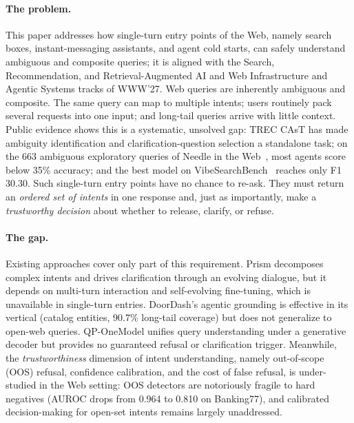 \documentclass[sigconf, anonymous, review]{acmart}
\begin{document}
\paragraph{The problem.}
This paper addresses how single-turn entry points of the Web, namely search boxes, instant-messaging assistants, and agent cold starts, can safely understand ambiguous and composite queries; it is aligned with the Search, Recommendation, and Retrieval-Augmented AI and Web Infrastructure and Agentic Systems tracks of WWW'27. Web queries are inherently ambiguous and composite. The same query can map to multiple intents; users routinely pack several requests into one input; and long-tail queries arrive with little context. Public evidence shows this is a systematic, unsolved gap: TREC CAsT has made ambiguity identification and clarification-question selection a standalone task; on the 663 ambiguous exploratory queries of Needle in the Web~\citep{needleweb}, most agents score below 35\% accuracy; and the best model on VibeSearchBench~\citep{vibesearch} reaches only F1 30.30. Such single-turn entry points have no chance to re-ask. They must return an \textit{ordered set of intents} in one response and, just as importantly, make a \textit{trustworthy decision} about whether to release, clarify, or refuse.

\paragraph{The gap.}
Existing approaches cover only part of this requirement. Prism decomposes complex intents and drives clarification through an evolving dialogue, but it depends on multi-turn interaction and self-evolving fine-tuning, which is unavailable in single-turn entries. DoorDash's agentic grounding is effective in its vertical (catalog entities, 90.7\% long-tail coverage) but does not generalize to open-web queries. QP-OneModel unifies query understanding under a generative decoder but provides no guaranteed refusal or clarification trigger. Meanwhile, the \emph{trustworthiness} dimension of intent understanding, namely out-of-scope (OOS) refusal, confidence calibration, and the cost of false refusal, is under-studied in the Web setting: OOS detectors are notoriously fragile to hard negatives (AUROC drops from 0.964 to 0.810 on Banking77), and calibrated decision-making for open-set intents remains largely unaddressed.
\end{document}
